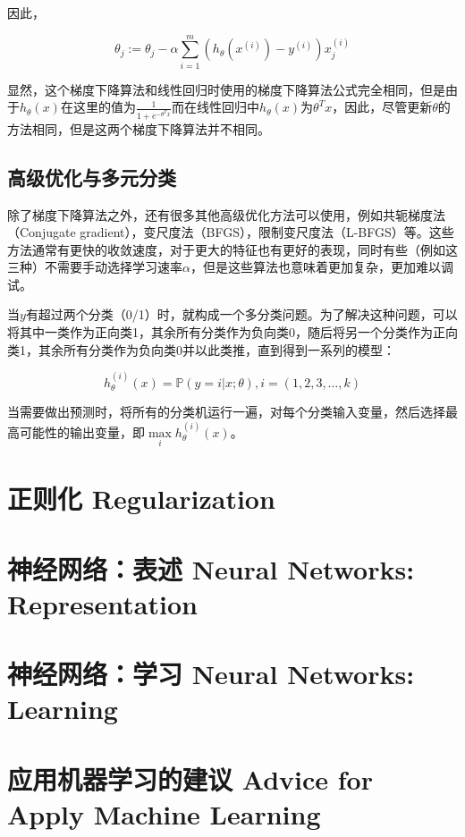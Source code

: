 \documentclass[12pt, a4paper]{article}
\begin{document}
因此，

\begin{equation*}
    \theta_j:=\theta_j-\alpha\sum_{i=1}^{m}(h_\theta(x^{(i)})-y^{(i)})x_j^{(i)}
\end{equation*}

显然，这个梯度下降算法和线性回归时使用的梯度下降算法公式完全相同，但是由于$h_\theta(x)$在这里的值为$\frac{1}{1+e^{-\theta^Tx}}$而在线性回归中$h_\theta(x)$为$\theta^Tx$，因此，尽管更新$\theta$的方法相同，但是这两个梯度下降算法并不相同。

\subsection{高级优化与多元分类}

除了梯度下降算法之外，还有很多其他高级优化方法可以使用，例如共轭梯度法（Conjugate gradient），变尺度法（BFGS），限制变尺度法（L-BFGS）等。这些方法通常有更快的收敛速度，对于更大的特征也有更好的表现，同时有些（例如这三种）不需要手动选择学习速率$\alpha$，但是这些算法也意味着更加复杂，更加难以调试。

当$y$有超过两个分类（0/1）时，就构成一个多分类问题。为了解决这种问题，可以将其中一类作为正向类1，其余所有分类作为负向类0，随后将另一个分类作为正向类1，其余所有分类作为负向类0并以此类推，直到得到一系列的模型：

\begin{equation*}
    h_\theta^{(i)}(x) = \mathbb{P}(y=i|x; \theta), i=(1,2,3,\dots,k)
\end{equation*}

当需要做出预测时，将所有的分类机运行一遍，对每个分类输入变量，然后选择最高可能性的输出变量，即$\mathop{max}\limits_ih_\theta^{(i)}(x)$。

\section{正则化 Regularization}

\section{神经网络：表述 Neural Networks: Representation}

\section{神经网络：学习 Neural Networks: Learning}

\section{应用机器学习的建议 Advice for Apply Machine Learning}
\end{document}
